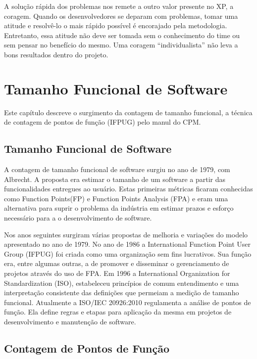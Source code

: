 A solução rápida dos problemas nos remete a outro valor presente no XP, a coragem. Quando os desenvolvedores se deparam com problemas, tomar uma atitude e resolvê-lo o mais rápido possível é encorajado pela metodologia. Entretanto, essa atitude não deve ser tomada sem o conhecimento do time ou sem pensar no benefício do mesmo. Uma coragem “individualista” não leva a bons resultados dentro do projeto.



\chapter[Tamanho Funcional de Software]{Tamanho Funcional de Software}

Este capítulo descreve o surgimento da contagem de tamanho funcional, a técnica de contagem de pontos de função (IFPUG) pelo manul do CPM.

\section{Tamanho Funcional de Software}

A contagem de tamanho funcional de software surgiu no ano de 1979, com Albrecht. A proposta era estimar o tamanho de um software a partir das funcionalidades entregues ao usuário. Estas primeiras métricas ficaram conhecidas como Function Points(FP)  e  Function Points Analysis (FPA)  e eram uma alternativa para suprir o problema da indústria em estimar prazos e esforço necessário para a o desenvolvimento de software.

Nos anos seguintes surgiram várias propostas de melhoria e variações do modelo apresentado no ano de 1979. No ano de 1986 a International Function Point User Group (IFPUG) foi criada como uma organização sem fins lucrativos. Sua função era, entre algumas outras, a de promover e disseminar o gerenciamento de projetos através do uso de FPA. Em 1996 a International Organization for Standardization (ISO), estabeleceu princípios de comum entendimento e uma interpretação consistente das  definições que permeiam a medição de tamanho funcional. Atualmente a ISO/IEC 20926:2010 regulamenta a análise de pontos de função. Ela define regras e etapas para aplicação da mesma em projetos de desenvolvimento e manutenção de software.

\section{Contagem de Pontos de Função}

